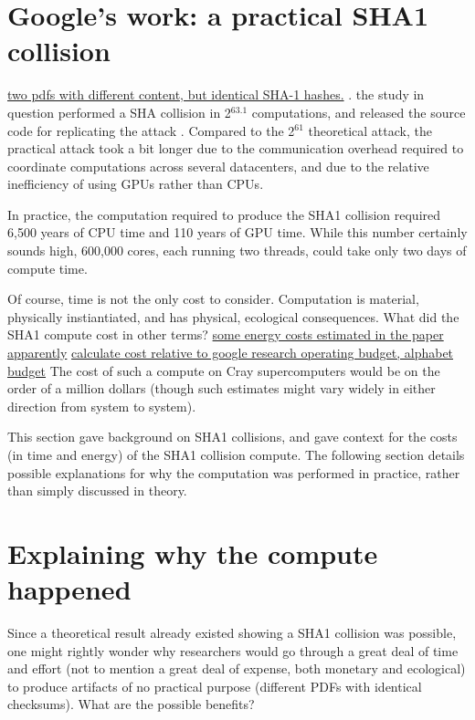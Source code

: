 \documentclass[sigconf]{acmart}
\begin{document}
\section{Google's work: a practical SHA1 collision}
\label{sec:orge38c685}

\uline{two pdfs with different content, but identical SHA-1 hashes.}
\cite{Stevens2017}.
the study in question performed a SHA collision in 2\(^{\text{63.1}}\) computations, 
and released the source code for replicating the attack
\cite{Stevens2017github}.
Compared to the 2\(^{\text{61}}\) theoretical attack, the practical attack took a bit longer due to the communication overhead required to coordinate computations across several datacenters, and due to the relative inefficiency of using GPUs rather than CPUs.

In practice, the computation required to produce the SHA1 collision required 6,500 years of CPU time and 110 years of GPU time. While this number certainly sounds high, 600,000 cores, each running two threads, could take only two days of compute time.

Of course, time is not the only cost to consider.
Computation is material, physically instiantiated, and has physical, ecological consequences.
What did the SHA1 compute cost in other terms?
\uline{some energy costs estimated in the paper apparently}
\uline{calculate cost relative to google research operating budget, alphabet budget}
The cost of such a compute on Cray supercomputers would be on the order of a million dollars
\cite{Pautsch2016}
(though such estimates might vary widely in either direction from system to system).

This section gave background on SHA1 collisions, 
and gave context for the costs (in time and energy) of the SHA1 collision compute.
The following section details possible explanations for why the computation was performed
in practice, rather than simply discussed in theory.


\section{Explaining why the compute happened}
\label{sec:orgcddf27b}

Since a theoretical result already existed showing a SHA1 collision was possible, 
one might rightly wonder why researchers would go through a great deal of time and effort
(not to mention a great deal of expense, both monetary and ecological)
to produce artifacts of no practical purpose (different PDFs with identical checksums).
What are the possible benefits?
\end{document}
